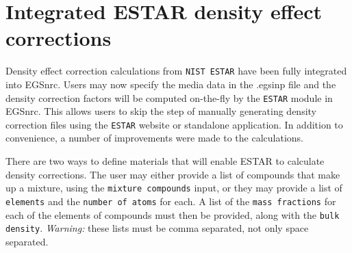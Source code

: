 
%
%
%
%
%
%
%
%
%




\section{Integrated ESTAR density effect corrections}
\label{estar}

Density effect correction calculations from {\tt NIST ESTAR} have been fully integrated into EGSnrc. Users may now specify the media data in the .egsinp file and the density correction factors will be computed on-the-fly by the {\tt ESTAR} module in EGSnrc. This allows users to skip the step of manually generating density correction files using the {\tt ESTAR} website or standalone application. In addition to convenience, a number of improvements were made to the calculations.

There are two ways to define materials that will enable ESTAR to calculate density corrections. The user may either provide a list of compounds that make up a mixture, using the {\tt mixture compounds} input, or they may provide a list of {\tt elements} and the {\tt number of atoms} for each. A list of the {\tt mass fractions} for each of the elements of compounds must then be provided, along with the {\tt bulk density}. {\em Warning:} these lists must be comma separated, not only space separated.

